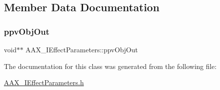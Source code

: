 \subsection{Member Data Documentation}
\mbox{\label{a01825_ae2e7b2d7553902b3e8163e8d1ef640dc}} 
\subsubsection{\texorpdfstring{ppvObjOut}{ppvObjOut}}
{\footnotesize\ttfamily void$\ast$$\ast$ A\+A\+X\+\_\+\+I\+Effect\+Parameters\+::ppv\+Obj\+Out}



The documentation for this class was generated from the following file\+:\begin{DoxyCompactItemize}
\item 
\mbox{\hyperlink{a00599}{A\+A\+X\+\_\+\+I\+Effect\+Parameters.\+h}}\end{DoxyCompactItemize}
